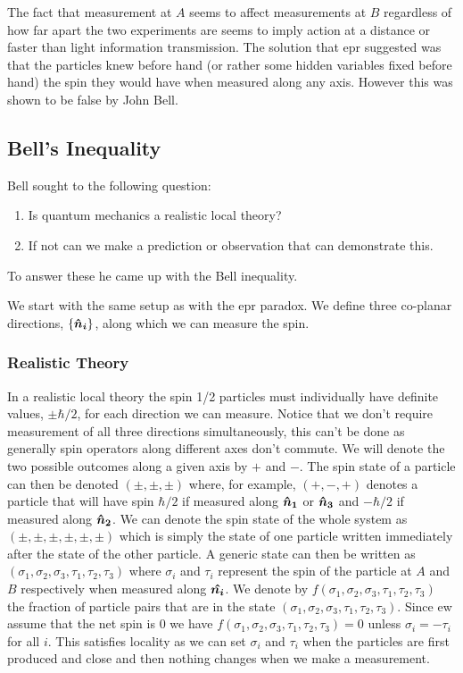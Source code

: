     The fact that measurement at \(A\) seems to affect measurements at \(B\) regardless of how far apart the two experiments are seems to imply action at a distance or faster than light information transmission.
    The solution that \gls{epr} suggested was that the particles knew before hand (or rather some hidden variables fixed before hand) the spin they would have when measured along any axis.
    However this was shown to be false by John Bell.
    
    \subsection{Bell's Inequality}
    Bell sought to the following question:
    \begin{enumerate}
        \item Is quantum mechanics a realistic local theory?
        \item If not can we make a prediction or observation that can demonstrate this.
    \end{enumerate}
    To answer these he came up with the Bell inequality.
    
    We start with the same setup as with the \gls{epr} paradox.
    We define three co-planar directions, \(\{\bm{\hat{n}}\bm{_{i}}\}\), along which we can measure the spin.
    
    \subsubsection{Realistic Theory}
    In a realistic local theory the spin 1/2 particles must individually have definite values, \(\pm\hbar/2\), for each direction we can measure.
    Notice that we don't require measurement of all three directions simultaneously, this can't be done as generally spin operators along different axes don't commute.
    We will denote the two possible outcomes along a given axis by \(+\) and \(-\).
    The spin state of a particle can then be denoted \((\pm, \pm, \pm)\) where, for example, \((+, -, +)\) denotes a particle that will have spin \(\hbar/2\) if measured along \(\bm{\hat{n}}\bm{_1}\) or \(\bm{\hat{n}}\bm{_3}\) and \(-\hbar/2\) if measured along \(\bm{\hat{n}}\bm{_2}\).
    We can denote the spin state of the whole system as \((\pm, \pm, \pm, \pm, \pm, \pm)\) which is simply the state of one particle written immediately after the state of the other particle.
    A generic state can then be written as \((\sigma_1, \sigma_2, \sigma_3, \tau_1, \tau_2, \tau_3)\) where \(\sigma_i\) and \(\tau_i\) represent the spin of the particle at \(A\) and \(B\) respectively when measured along \(\bm{\hat{n_i}}\).
    We denote by \(f(\sigma_1, \sigma_2, \sigma_3, \tau_1, \tau_2, \tau_3)\) the fraction of particle pairs that are in the state \((\sigma_1, \sigma_2, \sigma_3, \tau_1, \tau_2, \tau_3)\).
    Since ew assume that the net spin is \(0\) we have \(f(\sigma_1, \sigma_2, \sigma_3, \tau_1, \tau_2, \tau_3) = 0\) unless \(\sigma_i = -\tau_i\) for all \(i\).
    This satisfies locality as we can set \(\sigma_i\) and \(\tau_i\) when the particles are first produced and close and then nothing changes when we make a measurement.
    
